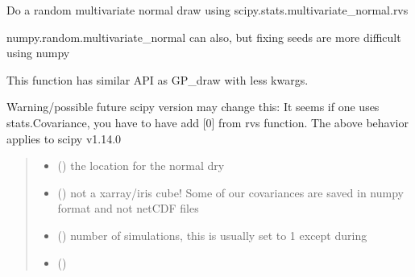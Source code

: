 \documentclass[letterpaper,10pt,english]{sphinxmanual}
\begin{document}
\begin{fulllineitems}
\label{\detokenize{kriging:glomar_gridding.stochastic.scipy_mv_normal_draw}}
\pysigstartsignatures
\pysiglinewithargsret
{}
{\sphinxparamcomma {}\sphinxparamcomma {}\sphinxparamcomma {}\sphinxparamcomma {}}
{}
\pysigstopsignatures
\sphinxAtStartPar
Do a random multivariate normal draw using
scipy.stats.multivariate\_normal.rvs

\sphinxAtStartPar
numpy.random.multivariate\_normal can also,
but fixing seeds are more difficult using numpy

\sphinxAtStartPar
This function has similar API as GP\_draw with less kwargs.

\sphinxAtStartPar
Warning/possible future scipy version may change this:
It seems if one uses stats.Covariance, you have to have add {[}0{]} from rvs
function. The above behavior applies to scipy v1.14.0
\begin{quote}\begin{description}
\begin{itemize}
\item {}
\sphinxAtStartPar
{} () \textendash{} the location for the normal dry

\item {}
\sphinxAtStartPar
{} () \textendash{} not a xarray/iris cube! Some of our covariances are saved in numpy
format and not netCDF files

\item {}
\sphinxAtStartPar
{} () \textendash{} number of simulations, this is usually set to 1 except during

\item {}
\sphinxAtStartPar
{} ()


\end{itemize}
\end{description}
\end{quote}
\end{fulllineitems}
\end{document}
